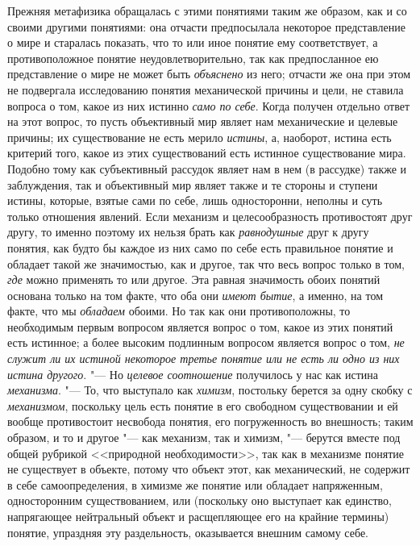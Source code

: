 {{Прежняя метафизика обращалась с этими понятиями таким же
образом, как и со своими другими понятиями: она отчасти предпосылала
некоторое представление о мире и старалась показать, что то или иное
понятие ему соответствует, а противоположное понятие неудовлетворительно,
так как предпосланное ею представление о мире не может быть
{\em объяснено} из него;
отчасти же она при этом не подвергала исследованию понятия механической
причины и цели, не ставила вопроса о том, какое из них истинно
{\em само по себе}. Когда
получен отдельно ответ на этот вопрос, то пусть объективный мир являет нам
механические и целевые причины; их существование не есть мерило
{\em истины}, а,
наоборот, истина есть критерий того, какое из этих существований есть
истинное существование мира. Подобно тому как субъективный рассудок являет
нам в нем (в рассудке) также и заблуждения, так и объективный мир являет
также и те стороны и ступени истины, которые, взятые сами по себе, лишь
односторонни, неполны и суть только отношения явлений. Если механизм и
целесообразность противостоят друг другу, то именно поэтому их нельзя брать
как {\em равнодушные}
друг к другу понятия, как будто бы каждое из них само по себе
есть правильное понятие и обладает такой же значимостью, как и другое, так
что весь вопрос только в том, {\em где}
можно применять то или другое. Эта равная
значимость обоих понятий основана только на том факте, что
оба они {\em имеют бытие},
а именно, на том факте, что мы
{\em обладаем} обоими. Но
так как они противоположны, то необходимым первым вопросом является вопрос
о том, какое из этих понятий есть истинное; а более высоким подлинным
вопросом является вопрос о том, {\em не
служит ли их истиной некоторое третье понятие или не есть ли одно из них
истина другого}. "--- Но
{\em целевое соотношение}
получилось у нас как истина
{\em механизма}. "--- То,
что выступало как {\em химизм},
постольку берется за одну скобку с
{\em механизмом},
поскольку цель есть понятие в его свободном существовании и
ей вообще противостоит несвобода понятия, его погруженность во внешность;
таким образом, и то и другое "--- как механизм, так и химизм,
"--- берутся вместе под общей рубрикой <<природной
необходимости>>, так как в механизме понятие не существует в объекте, потому
что объект этот, как механический, не содержит в себе самоопределения, в
химизме же понятие или обладает напряженным, односторонним существованием,
или (поскольку оно выступает как единство, напрягающее нейтральный объект и
расщепляющее его на крайние термины) понятие, упраздняя эту раздельность,
оказывается внешним самому себе.

}}
